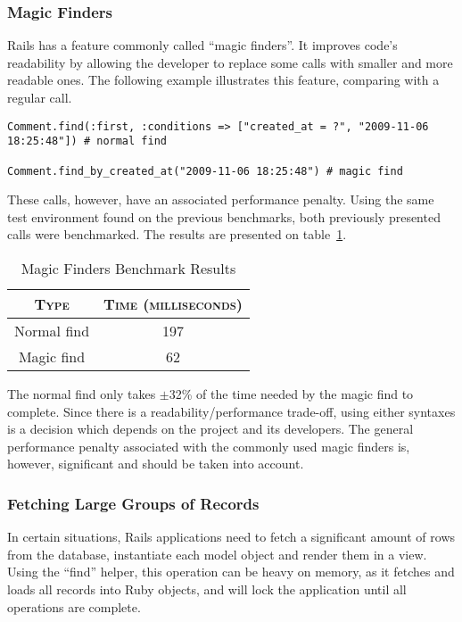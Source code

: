 \subsubsection{Magic Finders}
Rails has a feature commonly called ``magic finders''. It improves code's readability by allowing the developer to replace some calls with smaller and more readable ones. The following example illustrates this feature, comparing with a regular call.
\begin{lstlisting}[xleftmargin=30pt,xrightmargin=30pt]
Comment.find(:first, :conditions => ["created_at = ?", "2009-11-06 18:25:48"]) # normal find

Comment.find_by_created_at("2009-11-06 18:25:48") # magic find
\end{lstlisting}
These calls, however, have an associated performance penalty. Using the same test environment found on the previous benchmarks, both previously presented calls were benchmarked. The results are presented on table~\ref{tab:magic_finders}.
\begin{table}[h!t]
  \centering
  \caption{Magic Finders Benchmark Results}
  \label{tab:magic_finders}
  
  \begin{tabular}{c|c}
  
    \textbf{\textsc{Type}} & \textbf{\textsc{Time (milliseconds)}} \\ \hline
    Normal find & 197 \\ \hline
    Magic find & 62 \\
  \end{tabular}
\end{table}

The normal find only takes $\pm$32\% of the time needed by the magic find to complete. Since there is a readability/performance trade-off, using either syntaxes is a decision which depends on the project and its developers. The general performance penalty associated with the commonly used magic finders is, however, significant and should be taken into account.


\subsubsection{Fetching Large Groups of Records}
In certain situations, Rails applications need to fetch a significant amount of rows from the database, instantiate each model object and render them in a view. Using the ``find'' helper, this operation can be heavy on memory, as it fetches and loads all records into Ruby objects, and will lock the application until all operations are complete.

